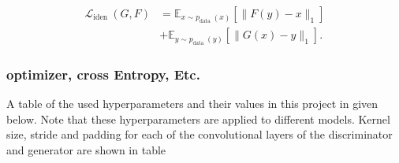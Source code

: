 \documentclass[12pt, fleqn, titlepage]{article}
\begin{document}
\[\begin{aligned}
	\mathcal{L}_{\text {iden }}(G, F) &=\mathbb{E}_{x \sim p_{\text {data }}(x)}\left[\|F(y)-x\|_{1}\right] \\
	&+\mathbb{E}_{y \sim p_{\text {data }}(y)}\left[\|G(x)-y\|_{1}\right] .
\end{aligned}\]


\subsubsection{optimizer, cross Entropy, Etc.}
A table of the used hyperparameters and their values in this project in given below. Note that these hyperparameters are applied to different models. Kernel size, stride and padding for each of the convolutional layers of the discriminator and generator are shown in table %
\end{document}
